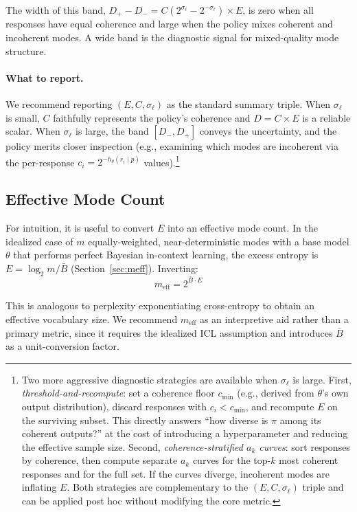 \documentclass[11pt]{article}
\begin{document}
The width of this band, $D_+ - D_- = C(2^{\sigma_\ell} - 2^{-\sigma_\ell}) \times E$, is zero when all responses have equal coherence and large when the policy mixes coherent and incoherent modes. A wide band is the diagnostic signal for mixed-quality mode structure.

\paragraph{What to report.} We recommend reporting $(E, C, \sigma_\ell)$ as the standard summary triple. When $\sigma_\ell$ is small, $C$ faithfully represents the policy's coherence and $D = C \times E$ is a reliable scalar. When $\sigma_\ell$ is large, the band $[D_-, D_+]$ conveys the uncertainty, and the policy merits closer inspection (e.g., examining which modes are incoherent via the per-response $c_i = 2^{-h_\theta(r_i \mid p)}$ values).\footnote{Two more aggressive diagnostic strategies are available when $\sigma_\ell$ is large. First, \emph{threshold-and-recompute}: set a coherence floor $c_{\min}$ (e.g., derived from $\theta$'s own output distribution), discard responses with $c_i < c_{\min}$, and recompute $E$ on the surviving subset. This directly answers ``how diverse is $\pi$ among its coherent outputs?'' at the cost of introducing a hyperparameter and reducing the effective sample size. Second, \emph{coherence-stratified $a_k$ curves}: sort responses by coherence, then compute separate $a_k$ curves for the top-$k$ most coherent responses and for the full set. If the curves diverge, incoherent modes are inflating $E$. Both strategies are complementary to the $(E, C, \sigma_\ell)$ triple and can be applied post hoc without modifying the core metric.}

\subsection{Effective Mode Count}\label{sec:meff-revisited}

For intuition, it is useful to convert $E$ into an effective mode count. In the idealized case of $m$ equally-weighted, near-deterministic modes with a base model $\theta$ that performs perfect Bayesian in-context learning, the excess entropy is $E = \log_2 m / \bar{B}$ (Section~\ref{sec:meff}). Inverting:
\begin{equation}
    m_{\mathrm{eff}} = 2^{\bar{B} \cdot E}
\end{equation}

This is analogous to perplexity exponentiating cross-entropy to obtain an effective vocabulary size. We recommend $m_{\mathrm{eff}}$ as an interpretive aid rather than a primary metric, since it requires the idealized ICL assumption and introduces $\bar{B}$ as a unit-conversion factor.
\end{document}
